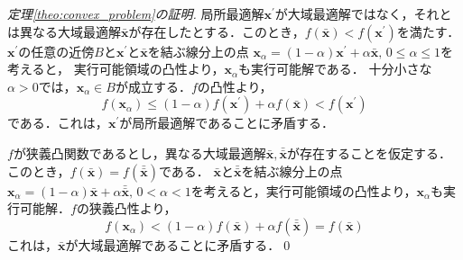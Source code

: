 \documentclass[dvipdfmx]{jsreport}
\begin{document}
\begin{proof}[定理\ref{theo:convex_problem}の証明]
  局所最適解$\bm{x}^{\prime}$が大域最適解ではなく，それとは異なる大域最適解$\bar{\bm{x}}$が存在したとする．このとき，$f(\bar{\bm{x}}) < f(\bm{x}^{\prime})$を満たす．$\bm{x}^{\prime}$の任意の近傍$B$と$\bm{x}^{\prime}$と$\bar{\bm{x}}$を結ぶ線分上の点
  $\bm{x}_{\alpha} =  (1 - \alpha)\bm{x}^{\prime} + \alpha \bar{\bm{x}}, \, 0 \leq \alpha \leq 1$を考えると，
  実行可能領域の凸性より，$\bm{x}_{\alpha}$も実行可能解である．
  十分小さな$\alpha > 0$では，$\bm{x}_{\alpha} \in B$が成立する．$f$の凸性より，
  \begin{equation}
    f(\bm{x}_{\alpha}) \leq (1 - \alpha)f(\bm{x}^{\prime}) + \alpha f(\bar{\bm{x}}) < f(\bm{x}^{\prime}) \nonumber
  \end{equation}
  である．これは，$\bm{x}^{\prime}$が局所最適解であることに矛盾する．

  $f$が狭義凸関数であるとし，異なる大域最適解$\bar{\bm{x}}, \bar{\bar{\bm{x}}}$が存在することを仮定する．このとき，$f(\bar{\bm{x}}) = f(\bar{\bar{\bm{x}}})$である．
  $\bar{\bm{x}}$と$\bar{\bar{\bm{x}}}$を結ぶ線分上の点
  $\bm{x}_{\alpha} = (1 - \alpha)\bar{\bm{x}} + \alpha \bar{\bar{\bm{x}}}, \, 0 < \alpha < 1$を考えると，実行可能領域の凸性より，$\bm{x}_{\alpha}$も実行可能解．$f$の狭義凸性より，
  \begin{equation}
    f(\bm{x}_{\alpha}) < (1 - \alpha)f(\bar{\bm{x}}) + \alpha f(\bar{\bar{\bm{x}}}) = f(\bar{\bm{x}}) \nonumber
  \end{equation}
  これは，$\bar{\bm{x}}$が大域最適解であることに矛盾する．\qed
\end{proof}
\end{document}
